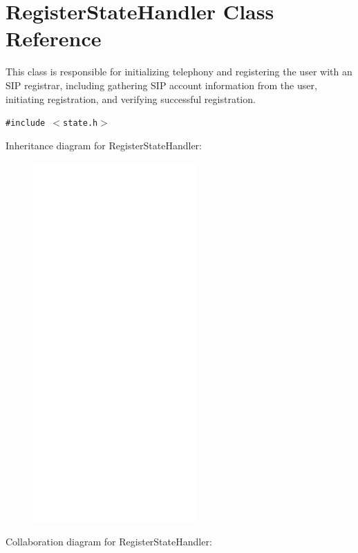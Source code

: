 \hypertarget{classRegisterStateHandler}{
\section{RegisterStateHandler Class Reference}
\label{classRegisterStateHandler}
}
This class is responsible for initializing telephony and registering the user with an SIP registrar, including gathering SIP account information from the user, initiating registration, and verifying successful registration.  


{\tt \#include $<$state.h$>$}

Inheritance diagram for RegisterStateHandler:\nopagebreak
\begin{figure}[H]
\begin{center}
\leavevmode
\includegraphics[width=178pt]{classRegisterStateHandler__inherit__graph}
\end{center}
\end{figure}
Collaboration diagram for RegisterStateHandler:\nopagebreak
